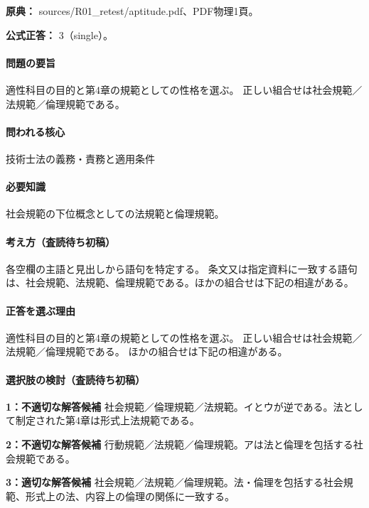 \noindent\textbf{原典：} sources/R01\_retest/aptitude.pdf、PDF物理1頁。

\textbf{公式正答：} 3（single）。

\paragraph{問題の要旨} 適性科目の目的と第4章の規範としての性格を選ぶ。 正しい組合せは社会規範／法規範／倫理規範である。

\paragraph{問われる核心} 技術士法の義務・責務と適用条件

\paragraph{必要知識} 社会規範の下位概念としての法規範と倫理規範。

\paragraph{考え方（査読待ち初稿）} 各空欄の主語と見出しから語句を特定する。 条文又は指定資料に一致する語句は、社会規範、法規範、倫理規範である。ほかの組合せは下記の相違がある。

\paragraph{正答を選ぶ理由} 適性科目の目的と第4章の規範としての性格を選ぶ。 正しい組合せは社会規範／法規範／倫理規範である。 ほかの組合せは下記の相違がある。

\paragraph{選択肢の検討（査読待ち初稿）}

\noindent\textbf{1：不適切な解答候補} 社会規範／倫理規範／法規範。イとウが逆である。法として制定された第4章は形式上法規範である。\par

\noindent\textbf{2：不適切な解答候補} 行動規範／法規範／倫理規範。アは法と倫理を包括する社会規範である。\par

\noindent\textbf{3：適切な解答候補} 社会規範／法規範／倫理規範。法・倫理を包括する社会規範、形式上の法、内容上の倫理の関係に一致する。\par

